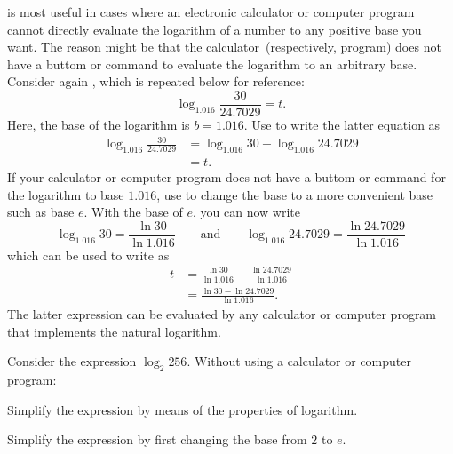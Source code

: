\documentclass[a4paper,oneside,12pt]{article}
\begin{document}
 is most useful in cases where
an electronic calculator or computer program cannot directly evaluate
the logarithm of a number to any positive base you want.  The reason
might be that the calculator~(respectively, program) does not have a
buttom or command to evaluate the logarithm to an arbitrary base.
Consider again
, which is
repeated below for reference:
\[
\log_{1.016} \frac{30}{24.7029}
=
t.
\]
Here, the base of the logarithm is $b = 1.016$.  Use
to write the latter equation as
\begin{equation}
\label{eqn:logarithm:Australia_population_doubling_time_change_of_base}
\begin{aligned}
\log_{1.016} \frac{30}{24.7029}
&=
\log_{1.016} 30 - \log_{1.016} 24.7029 \\[4pt]
&=
t.
\end{aligned}
\end{equation}
If your calculator or computer program does not have a buttom or
command for the logarithm to base $1.016$, use
 to change the base to a more
convenient base such as base $e$.  With the base of $e$, you can now
write
\[
\log_{1.016} 30
=
\frac{
  \ln 30
}{
  \ln 1.016
}
\qquad
\text{and}
\qquad
\log_{1.016} 24.7029
=
\frac{
  \ln 24.7029
}{
  \ln 1.016
}
\]
which can be used to write
as
\begin{align*}
t
&=
\frac{
  \ln 30
}{
  \ln 1.016
}
-
\frac{
  \ln 24.7029
}{
  \ln 1.016
} \\[4pt]
&=
\frac{
  \ln 30 - \ln 24.7029
}{
  \ln 1.016
}.
\end{align*}
The latter expression can be evaluated by any calculator or computer
program that implements the natural logarithm.

\begin{exercise}
Consider the expression $\log_2 256$.  Without using a calculator or
computer program:
\begin{packedenum}
\item\label{subex:logarithm:log_2_256_properties}
  Simplify the expression by means of the properties of logarithm.

\item\label{subex:logarithm:log_2_256_change_base}
  Simplify the expression by first changing the base from $2$ to $e$.
\end{packedenum}
\end{exercise}
\end{document}
